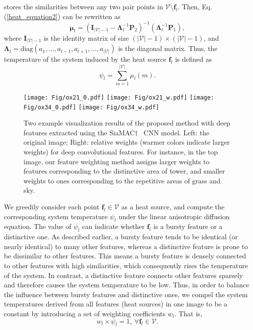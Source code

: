 \documentclass[journal]{IEEEtran}
\begin{document}
stores the similarities between any two pair points in $\mathcal {V} \setminus \boldsymbol{f}_l$.
Then, Eq.(\ref{heat_equation2}) can be rewritten as
\begin{equation}\label{heat_equation3}
\boldsymbol{\mu}_l = (\boldsymbol{I}_{|\mathcal {V}|-1}-\boldsymbol{\Lambda}^{-1}_{l}\boldsymbol{P}_2)^{-1}(\boldsymbol{\Lambda}^{-1}_{l}\boldsymbol{P}_1),
\end{equation}
where $\boldsymbol{I}_{|\mathcal {V}|-1}$ is the identity matrix of size $(|\mathcal {V}|-1) \times (|\mathcal {V}|-1)$, and $\boldsymbol{\Lambda}_l = \text{diag}(a_1,\ldots, a_{l-1}, a_{l+1}, \ldots, a_{|\mathcal {V}|})$ is the diagonal matrix.
Thus, the temperature of the system induced by the heat source $\boldsymbol{f}_l$ is defined as
\begin{equation}\label{psi_l}
\psi_l = \sum_{m=1}^{|\mathcal {V}|}\mu_l(m).
\end{equation}

\begin{figure}[t]
    \centering
    \texttt{[image: Fig/ox21\_0.pdf]}
    \texttt{[image: Fig/ox21\_w.pdf]}
    \texttt{[image: Fig/ox34\_0.pdf]}
    \texttt{[image: Fig/ox34\_w.pdf]}
    \caption{Two example visualization results of the proposed method with deep features extracted using the SiaMAC$\dagger$~\cite{radenovic2016cnn} CNN model. Left: the original image; Right: relative weights (warmer colors indicate larger weights) for deep convolutional features. For instance, in the top image,
    our feature weighting method assigns larger weights to features corresponding to the distinctive area of tower, and smaller weights to ones corresponding to the repetitive areas of grass and sky.}\label{fig:visualizing_results}
\end{figure}

We greedily consider each point $\boldsymbol{f}_l \in \mathcal {V}$ as a heat source, and compute the corresponding system temperature $\psi_l$ under the linear anisotropic diffusion equation.
The value of $\psi_l$ can indicate whether $\boldsymbol{f}_l$ is a bursty feature or a distinctive one.
As described earlier, a bursty feature tends to be identical (or nearly identical) to many other features, whereas a distinctive feature is prone to be dissimilar to other features.
This means a bursty feature is densely connected to other features with high similarities, which consequently rises the temperature of the system.
In contrast, a distinctive feature connects other features sparsely and therefore causes the system temperature to be low.
Thus, in order to balance the influence between bursty features and distinctive ones,
we compel the system temperatures derived from all features (heat sources) in one image to be a constant by introducing a set of weighting coefficients $w_l$.
That is,
\begin{equation}
w_l\times \psi_l = 1, ~\forall \boldsymbol{f}_l \in \mathcal {V}.
\end{equation}
\end{document}
